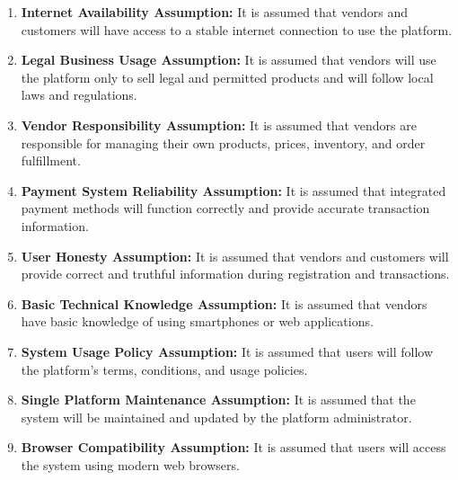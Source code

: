 \begin{enumerate}
    \item \textbf{Internet Availability Assumption:} It is assumed that vendors and customers will have access to a stable internet connection to use the platform.
    
    \item \textbf{Legal Business Usage Assumption:} It is assumed that vendors will use the platform only to sell legal and permitted products and will follow local laws and regulations.
    
    \item \textbf{Vendor Responsibility Assumption:} It is assumed that vendors are responsible for managing their own products, prices, inventory, and order fulfillment.
    
    \item \textbf{Payment System Reliability Assumption:} It is assumed that integrated payment methods will function correctly and provide accurate transaction information.
    
    \item \textbf{User Honesty Assumption:} It is assumed that vendors and customers will provide correct and truthful information during registration and transactions.
    
    \item \textbf{Basic Technical Knowledge Assumption:} It is assumed that vendors have basic knowledge of using smartphones or web applications.
    
    \item \textbf{System Usage Policy Assumption:} It is assumed that users will follow the platform's terms, conditions, and usage policies.
    
    \item \textbf{Single Platform Maintenance Assumption:} It is assumed that the system will be maintained and updated by the platform administrator.
    
    \item \textbf{Browser Compatibility Assumption:} It is assumed that users will access the system using modern web browsers.
\end{enumerate}
